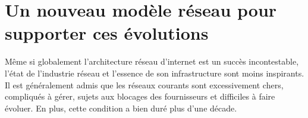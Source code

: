 \section{Un nouveau modèle réseau pour supporter ces évolutions}


Même si globalement l'architecture réseau d'internet est un succès incontestable, l'état de l'industrie réseau et l'essence de son infrastructure sont moins inspirants. Il est généralement admis que les réseaux courants sont excessivement chers, compliqués à gérer, sujets aux blocages des fournisseurs et difficiles à faire évoluer. En plus, cette condition a bien duré plus d'une décade. \cite{fabricIntro}




